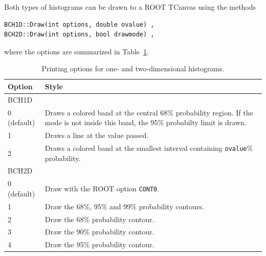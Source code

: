 \documentclass[11pt, a4paper]{article}
\newcommand{\BAT}{{\sc BAT}}
\begin{document}
\noindent 
Both types of histograms can be drawn to a ROOT TCanvas using the
methods
%
\begin{verbatim}
BCH1D::Draw(int options, double ovalue) , 
BCH2D::Draw(int options, bool drawmode) , 
\end{verbatim}  
%
where the options are summarized in Table~\ref{table:printingoptions}.

\begin{table}[ht!]
\begin{tabular}{ll}
\hline
Option & Style \\ 
\hline
BCH1D & \\ 
\hline 
0 (default) & \begin{minipage}[l]{12 cm}Draws a colored band at the central 68\% probability region. If the mode is not inside this band, the 95\% probabilty limit is drawn. \end{minipage}\\ 
1           & Draws a line at the value passed. \\ 
2           & Draws a colored band at the smallest interval containing \verb|ovalue|\% probability. \\
\hline 
BCH2D & \\ 
\hline 
0 (default) & Draw with the ROOT option \verb|CONT0|. \\ 
1           & Draw the 68\%, 95\% and 99\% probability contours. \\ 
2           & Draw the 68\% probability contour. \\ 
3           & Draw the 90\% probability contour. \\ 
4           & Draw the 95\% probability contour. \\ 
\hline
\end{tabular}
\caption{Printing options for one- and two-dimensional histograms. 
\label{table:printingoptions}} 
\end{table}



\end{document}
